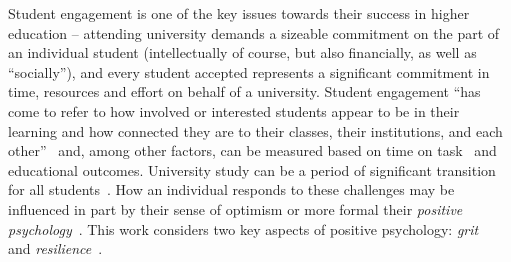 \documentclass[sigconf]{acmart}
\begin{document}

Student engagement is one of the key issues towards their success in higher education -- attending university demands a sizeable commitment on the part of an individual student (intellectually of course, but also financially, as well as ``socially''), and every student accepted represents a significant commitment in time, resources and effort on behalf of a university. Student engagement ``has come to refer to how involved or interested students appear to be in their learning and how connected they are to their classes, their institutions, and each other''~\citep[p.~38]{Axelson2010} and, among other factors, can be measured based on time on task~\cite{kuh2009national} and educational outcomes. University study can be a period of significant transition for all students~\cite{Tinto1975}. How an individual responds to these challenges may be influenced in part by their sense of optimism or more formal their {\em positive psychology}~\cite{Seligman90}. This work considers two key aspects of positive psychology: {\em{grit}}~\cite{Duckworth2007,Duckworth2016} and {\em resilience}~\cite{Clarke2010}.  

\end{document}
